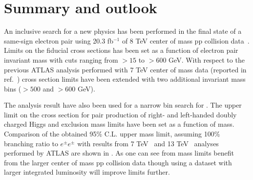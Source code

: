 \section{Summary and outlook}
\label{sec:ssOutlook}

An inclusive search for a new physics has been performed in the final state of a same-sign electron pair using 20.3 fb$^{-1}$ of 8 TeV center of mass pp collision data~\cite{ss_8TeV}. Limits on the fiducial cross sections has been set as a function of electron pair invariant mass with cuts ranging from $>15$ to $>600$ GeV.
With respect to the previous ATLAS analysis performed with 7 TeV center of mass data (reported in ref.~\cite{ss_7TeV}) cross section limits have been 
extended with two additional invariant mass bins ($>500$ and $>600$ GeV).

The analysis result have also been used for a narrow bin search for \dch.
The upper limit on the cross section for pair production of right- and left-handed doubly charged Higgs and exclusion mass limits have been set as a function of \dch mass.
Comparison of the obtained 95\% C.L. upper \dch mass limit, assuming 100\% branching ratio to $e^{\pm}e^{\pm}$ with results from 7 TeV~\cite{dch_7TeV_paper} and 13 TeV~\cite{dch_13TeV_conf} analyses performed by ATLAS are shown in .
As one can see from  mass limits benefit from the larger center of mass pp collision data though using a dataset with larger integrated luminosity will improve limits further.

